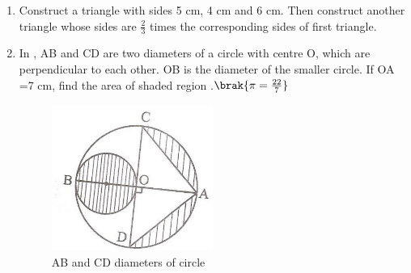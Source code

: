 \begin{enumerate}
\item Construct a triangle with sides 5 cm, 4 cm and 6 cm. Then construct another triangle whose sides are $\frac{2}{3}$ times the corresponding sides of first triangle.

\item In , AB and CD are two diameters of a circle with centre O, which are perpendicular to each other. OB is the diameter of the smaller circle. If OA =7 cm, find the area of shaded region .$\brak{ \pi = \frac{22}{7}}$\\
	\begin{figure}[H]
		\centering
\includegraphics[width=\columnwidth]{figs/6.png}
\caption{AB and CD diameters of circle}
\label{fig:fig6}
	\end{figure}
	\end{enumerate}

